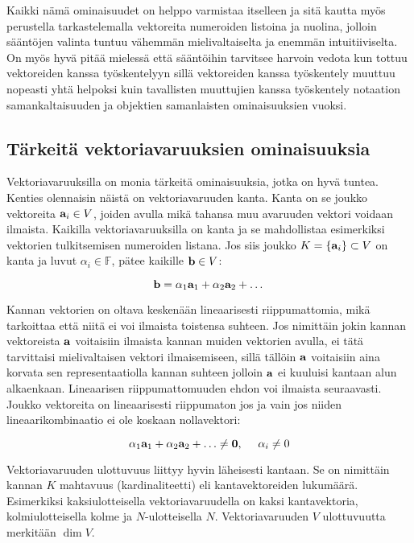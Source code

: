 \documentclass[../johdoksia.tex]{subfiles}
\begin{document}
	Kaikki nämä ominaisuudet on helppo varmistaa itselleen ja sitä kautta myös perustella tarkastelemalla vektoreita numeroiden listoina ja nuolina, jolloin sääntöjen valinta tuntuu vähemmän mielivaltaiselta ja enemmän intuitiiviselta. On myös hyvä pitää mielessä että sääntöihin tarvitsee harvoin vedota kun tottuu vektoreiden kanssa työskentelyyn sillä vektoreiden kanssa työskentely muuttuu nopeasti yhtä helpoksi kuin tavallisten muuttujien kanssa työskentely notaation samankaltaisuuden ja objektien samanlaisten ominaisuuksien vuoksi.
	
	\subsection{Tärkeitä vektoriavaruuksien ominaisuuksia}
	
	Vektoriavaruuksilla on monia tärkeitä ominaisuuksia, jotka on hyvä tuntea. Kenties olennaisin näistä on vektoriavaruuden kanta. Kanta on se joukko vektoreita $\mathbf{a}_i \in V$, joiden avulla mikä tahansa muu avaruuden vektori voidaan ilmaista. Kaikilla vektoriavaruuksilla on kanta ja se mahdollistaa esimerkiksi vektorien tulkitsemisen numeroiden listana. Jos siis joukko $K = \{\mathbf{a}_i\} \subset V$ on kanta ja luvut $\alpha_i \in \mathbb{F}$, pätee kaikille $\mathbf{b} \in V$:
	
	\begin{equation}
		\mathbf{b} = \alpha_1\mathbf{a}_1 + \alpha_2\mathbf{a}_2 + \dots  
	\end{equation}

	Kannan vektorien on oltava keskenään lineaarisesti riippumattomia, mikä tarkoittaa että niitä ei voi ilmaista toistensa suhteen. Jos nimittäin jokin kannan vektoreista $\mathbf{a}$ voitaisiin ilmaista kannan muiden vektorien avulla, ei tätä tarvittaisi mielivaltaisen vektori ilmaisemiseen, sillä tällöin $\mathbf{a}$ voitaisiin aina korvata sen representaatiolla kannan suhteen jolloin $\mathbf{a}$ ei kuuluisi kantaan alun alkaenkaan. Lineaarisen riippumattomuuden ehdon voi ilmaista seuraavasti. Joukko vektoreita on lineaarisesti riippumaton jos ja vain jos niiden lineaarikombinaatio ei ole koskaan nollavektori:
	
	\begin{equation}
		\alpha_1\mathbf{a}_1 + \alpha_2\mathbf{a}_2 + \dots \neq \mathbf{0}, \ \ \ \ \alpha_i \neq 0
	\end{equation}

	Vektoriavaruuden ulottuvuus liittyy hyvin läheisesti kantaan. Se on nimittäin kannan $K$ mahtavuus (kardinaliteetti) eli kantavektoreiden lukumäärä. Esimerkiksi kaksiulotteisella vektoriavaruudella on kaksi kantavektoria, kolmiulotteisella kolme ja $N$-ulotteisella $N$. Vektoriavaruuden $V$ ulottuvuutta merkitään $\dim V$.
	
\end{document}
